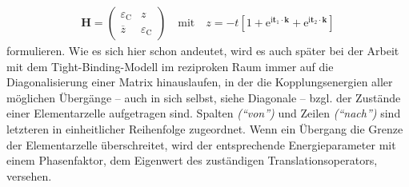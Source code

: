 \documentclass[a4paper, 10pt, twoside, openany]{book} %
\newcommand \bracks[1]{\left [ #1 \right ]}
\def \I {\mathrm i}
\def \E {\mathrm e}
\def \vec {\boldsymbol}
\newcommand \mat[1]{\begin{pmatrix} #1 \end{pmatrix}}
\def \eC {\varepsilon_\mathrm{C}}
\begin{document}
	\begin{align}
		\vec H = \mat{\eC & z \\ \overline z & \eC} \quad \text{mit} \quad z = -t \bracks{1 + \E^{\I \vec t_1 \cdot \vec k} + \E^{\I \vec t_2 \cdot \vec k}}
		\label{Energiematrix Graphen}
	\end{align}
	formulieren. Wie es sich hier schon andeutet, wird es auch später bei der Arbeit mit dem Tight-Binding-Modell im reziproken Raum immer auf die Diagonalisierung einer Matrix hinauslaufen, in der die Kopplungsenergien aller möglichen Übergänge -- auch in sich selbst, siehe Diagonale -- bzgl. der Zustände einer Elementarzelle aufgetragen sind. Spalten \emph{("`von"')} und Zeilen \emph{("`nach"')} sind letzteren in einheitlicher Reihenfolge zugeordnet. Wenn ein Übergang die Grenze der Elementarzelle überschreitet, wird der entsprechende Energieparameter mit einem Phasenfaktor, dem Eigenwert des zuständigen Translationsoperators, versehen.
	
\end{document}
